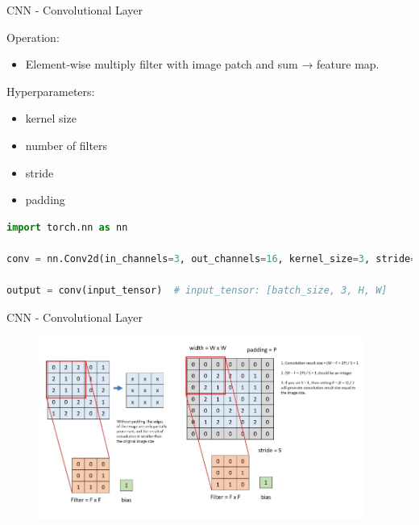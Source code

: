 \begin{frame}[fragile]{CNN - Convolutional Layer}
\begin{block}{Operation:}
    \begin{itemize}
        \item Element‑wise multiply filter with image patch and sum → feature map.
    \end{itemize}
\end{block}

\begin{block}{Hyperparameters:}
    \begin{itemize}
        \item kernel size
        \item number of filters
        \item stride
        \item padding
    \end{itemize}
\end{block}

\begin{lstlisting}[language=Python, caption={Code snippet (PyTorch)}]
import torch.nn as nn

conv = nn.Conv2d(in_channels=3, out_channels=16, kernel_size=3, stride=1, padding=1)

output = conv(input_tensor)  # input_tensor: [batch_size, 3, H, W]
\end{lstlisting}
\end{frame}  

\begin{frame}{CNN - Convolutional Layer}
    \begin{figure}
    \centering
    \includegraphics[width=0.95\textwidth,height=0.95\textheight,keepaspectratio]{images/convolutional-layer.png}
    \end{figure}
\end{frame}

